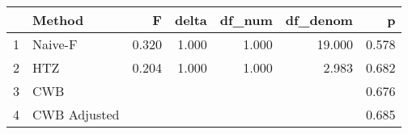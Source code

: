 \begin{table}[ht]
\centering
\begin{tabular}{rlrrrrr}
  \hline
 & Method & F & delta & df\_num & df\_denom & p \\ 
  \hline
1 & Naive-F & 0.320 & 1.000 & 1.000 & 19.000 & 0.578 \\ 
  2 & HTZ & 0.204 & 1.000 & 1.000 & 2.983 & 0.682 \\ 
  3 & CWB &  &  &  &  & 0.676 \\ 
  4 & CWB Adjusted &  &  &  &  & 0.685 \\ 
   \hline
\end{tabular}
\end{table}
